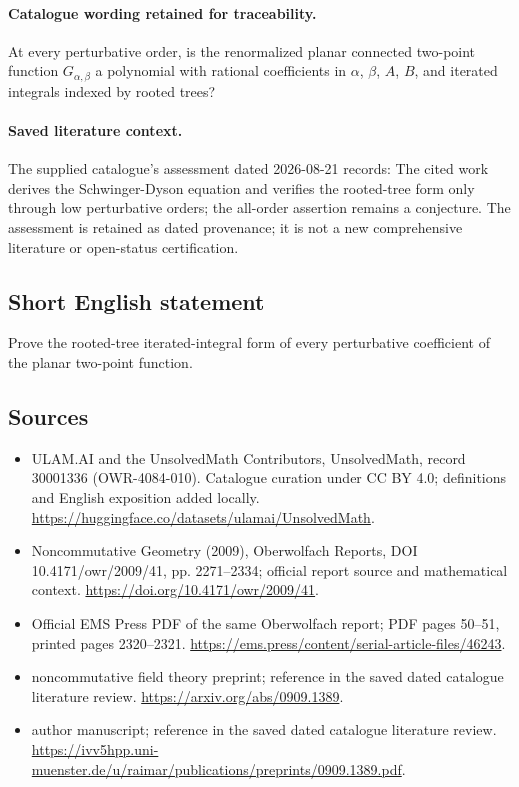 \documentclass[11pt]{article}
\begin{document}
\paragraph{Catalogue wording retained for traceability.}
At every perturbative order, is the renormalized planar connected two-point function $G_{\alpha,\beta}$ a polynomial with rational coefficients in $\alpha$, $\beta$, $A$, $B$, and iterated integrals indexed by rooted trees?

\paragraph{Saved literature context.} The supplied catalogue's assessment dated 2026-08-21 records: The cited work derives the Schwinger-Dyson equation and verifies the rooted-tree form only through low perturbative orders; the all-order assertion remains a conjecture. The assessment is retained as dated provenance; it is not a new comprehensive literature or open-status certification.
\subsection{Short English statement}
Prove the rooted-tree iterated-integral form of every perturbative coefficient of the planar two-point function.
\subsection{Sources}
\begin{itemize}
\item[\hypertarget{source:30001336:1}{S1}] ULAM.AI and the UnsolvedMath Contributors, UnsolvedMath, record 30001336 (OWR-4084-010). Catalogue curation under CC BY 4.0; definitions and English exposition added locally.
\url{https://huggingface.co/datasets/ulamai/UnsolvedMath}.
\item[\hypertarget{source:30001336:2}{S2}] Noncommutative Geometry (2009), Oberwolfach Reports, DOI 10.4171/owr/2009/41, pp. 2271--2334; official report source and mathematical context.
\url{https://doi.org/10.4171/owr/2009/41}.
\item[\hypertarget{source:30001336:3}{S3}] Official EMS Press PDF of the same Oberwolfach report; PDF pages 50--51, printed pages 2320--2321.
\url{https://ems.press/content/serial-article-files/46243}.
\item[\hypertarget{source:30001336:4}{S4}] noncommutative field theory preprint; reference in the saved dated catalogue literature review.
\url{https://arxiv.org/abs/0909.1389}.
\item[\hypertarget{source:30001336:5}{S5}] author manuscript; reference in the saved dated catalogue literature review.
\url{https://ivv5hpp.uni-muenster.de/u/raimar/publications/preprints/0909.1389.pdf}.
\end{itemize}
\label{end:30001336}
\end{document}

